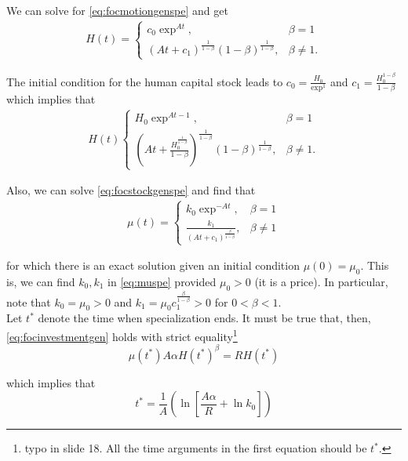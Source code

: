 \indent We can solve for \eqref{eq:focmotiongenspe} and get
\begin{eqnarray}
H(t) =
\begin{cases}
c_{0} \exp^{At}, & \beta = 1 \\ 
\left( At + c_{1} \right)^{\frac{1}{1 - \beta}} (1 - \beta)^{\frac{1}{1 - \beta}}, & \beta \neq 1.

\end{cases}
\end{eqnarray}

\noindent The initial condition for the human capital stock leads to $c_{0} = \frac{H_{0}}{\exp^{1}} $ and $c_{1} = \frac{H_{0}^{1 - \beta}}{1-\beta}$ which implies that
\begin{eqnarray}
H(t)
\begin{cases}
H_{0} \exp^{At - 1}, & \beta = 1 \\
\left( At + \frac{H_{0}^{\frac{1}{1-\beta}}}{1-\beta} \right)^{\frac{1}{1 - \beta}} \left( 1 - \beta \right)^{\frac{1}{1-\beta}}, & \beta \neq 1. \label{eq:humanspe}
\end{cases}
\end{eqnarray}

\indent Also, we can solve \eqref{eq:focstockgenspe} and find that
\begin{eqnarray}
\mu(t) =
\begin{cases}
k_{0} \exp^{-At}, & \beta = 1 \\
\frac{k_{1}}{(At + c_{1})^{\frac{\beta}{1-\beta}}}, & \beta \neq 1 \label{eq:muspe}
\end{cases}
\end{eqnarray}

\noindent for which there is an exact solution given an initial condition $\mu(0) = \mu_{0}$. This is, we can find $k_{0}, k_{1}$ in \eqref{eq:muspe} provided $\mu_{0} > 0$ (it is a price). In particular, note that $k_{0} = \mu_{0} > 0$ and $k_{1} = \mu_{0} c_{1}^{\frac{\beta}{1-\beta}} > 0$ for $0<\beta<1$.\\
\indent Let $t^*$ denote the time when specialization ends. It must be true that, then, \eqref{eq:focinvestmentgen} holds with strict equality\footnote{typo in slide 18. All the time arguments in the first equation should be $t^*$.}
\begin{equation}
\mu(t^*) A \alpha H(t^*)^{\beta} = RH(t^*)
\end{equation}

\noindent which implies that 
\begin{equation}
t^* = \frac{1}{A} \left( \ln \left[ \frac{A\alpha}{R} + \ln k_{0} \right] \right)
\end{equation}

